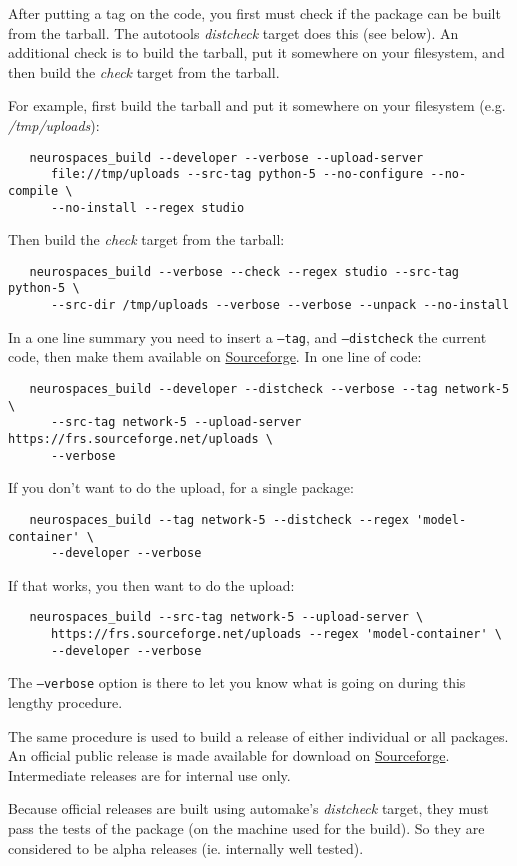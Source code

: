 \documentclass[12pt]{article}
\begin{document}
After putting a tag on the code, you first must check if the package
can be built from the tarball. The autotools {\it distcheck} target
does this (see below). An additional check is to build the tarball,
put it somewhere on your filesystem, and then build the {\it check}
target from the tarball.

For example, first build the tarball and put it somewhere on your filesystem (e.g. {\it /tmp/uploads}):
\begin{verbatim}
   neurospaces_build --developer --verbose --upload-server 
      file://tmp/uploads --src-tag python-5 --no-configure --no-compile \
      --no-install --regex studio
\end{verbatim}
Then build the {\it check} target from the tarball:
\begin{verbatim}
   neurospaces_build --verbose --check --regex studio --src-tag python-5 \
      --src-dir /tmp/uploads --verbose --verbose --unpack --no-install
\end{verbatim}

In a one line summary you need to insert a {\tt --tag}, and {\tt --distcheck} the current code, then make them available on \href{http://sourceforge.net/projects/neurospaces/}{Sourceforge}. In one line of code:
\begin{verbatim}
   neurospaces_build --developer --distcheck --verbose --tag network-5 \
      --src-tag network-5 --upload-server https://frs.sourceforge.net/uploads \
      --verbose
\end{verbatim}
If you don't want to do the upload, for a single package:
\begin{verbatim}
   neurospaces_build --tag network-5 --distcheck --regex 'model-container' \
      --developer --verbose
\end{verbatim}
If that works, you then want to do the upload:
\begin{verbatim}
   neurospaces_build --src-tag network-5 --upload-server \
      https://frs.sourceforge.net/uploads --regex 'model-container' \
      --developer --verbose
\end{verbatim}
The {\tt --verbose} option is there to let you know what is going on during this lengthy procedure.

The same procedure is used to build a release of either individual or all packages. An official public release is made available for download on \href{http://sourceforge.net/projects/neurospaces/}{Sourceforge}. Intermediate releases are for internal use only.

Because official releases are built using automake's {\it distcheck} target, they must pass the tests of the package (on the machine used for the build). So they are considered to be alpha releases (ie. internally well tested).
\end{document}
